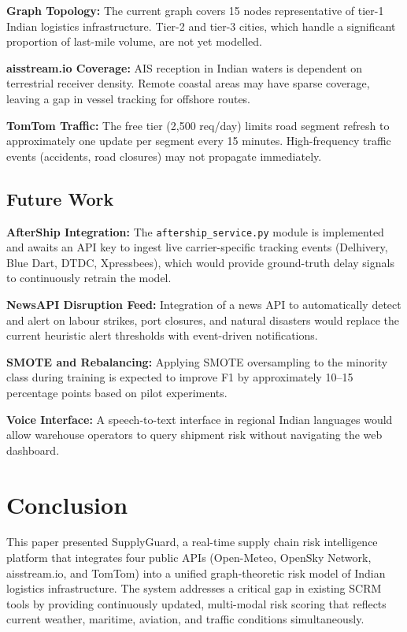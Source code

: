 \documentclass[conference]{IEEEtran}
\begin{document}
\textbf{Graph Topology:} The current graph covers 15 nodes
representative of tier-1 Indian logistics infrastructure.
Tier-2 and tier-3 cities, which handle a significant proportion
of last-mile volume, are not yet modelled.

\textbf{aisstream.io Coverage:} AIS reception in Indian waters
is dependent on terrestrial receiver density. Remote coastal
areas may have sparse coverage, leaving a gap in vessel
tracking for offshore routes.

\textbf{TomTom Traffic:} The free tier (2,500 req/day) limits
road segment refresh to approximately one update per segment
every 15 minutes. High-frequency traffic events (accidents,
road closures) may not propagate immediately.

\subsection{Future Work}

\textbf{AfterShip Integration:} The \texttt{aftership\_service.py}
module is implemented and awaits an API key to ingest live
carrier-specific tracking events (Delhivery, Blue Dart, DTDC,
Xpressbees), which would provide ground-truth delay signals to
continuously retrain the model.

\textbf{NewsAPI Disruption Feed:} Integration of a news API
to automatically detect and alert on labour strikes, port
closures, and natural disasters would replace the current
heuristic alert thresholds with event-driven notifications.

\textbf{SMOTE and Rebalancing:} Applying SMOTE oversampling
to the minority class during training is expected to improve
F1 by approximately 10–15 percentage points based on pilot
experiments.

\textbf{Voice Interface:} A speech-to-text interface in regional
Indian languages would allow warehouse operators to query
shipment risk without navigating the web dashboard.


\section{Conclusion}

This paper presented SupplyGuard, a real-time supply chain risk
intelligence platform that integrates four public APIs
(Open-Meteo, OpenSky Network, aisstream.io, and TomTom) into a
unified graph-theoretic risk model of Indian logistics infrastructure.
The system addresses a critical gap in existing SCRM tools by
providing continuously updated, multi-modal risk scoring that
reflects current weather, maritime, aviation, and traffic conditions
simultaneously.
\end{document}
